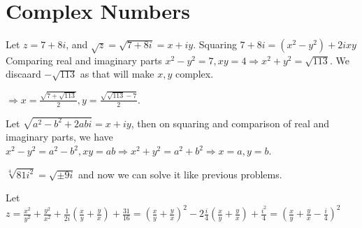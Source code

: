 \chapter{Complex Numbers}
\startitemize[n, 1*broad]
\item Let $z = 7 + 8i$, and $\sqrt{z} = \sqrt{7 + 8i} = x + iy$. Squaring $7 + 8i = (x^2 - y^2) + 2ixy$
  Comparing real and imaginary parts $x^2 - y^2 = 7, xy = 4 \Rightarrow x^2 + y^2 = \sqrt{113}$. We discaard
  $-\sqrt{113}$ as that will make $x, y$ complex.

  $\Rightarrow x = \frac{\sqrt{7 + \sqrt{113}}}{2}, y = \frac{\sqrt{\sqrt{113} - 7}}{2}$.
\item Let $\sqrt{a^2 - b^2 + 2abi} = x + iy$, then on squaring and comparison of real and imaginary parts,
  we have $x^2 - y^2 = a^2 - b^2, xy = ab\Rightarrow x^2 + y^2 = a^2 + b^2\Rightarrow x = a, y = b$.
\item $\sqrt[4]{81i^2} = \sqrt{\pm9i}$ and now we can solve it like previous problems.
\item Let $z = \frac{x^2}{y^2} + \frac{y^2}{x^2} + \frac{1}{2i}\left(\frac{x}{y} + \frac{y}{x}\right) +
  \frac{31}{16} = \left(\frac{x}{y} + \frac{y}{x}\right)^2 - 2\frac{i}{4}\left(\frac{x}{y} +
  \frac{y}{x}\right) + \frac{i^2}{4} = \left(\frac{x}{y} + \frac{y}{x} - \frac{i}{4}\right)^2$

